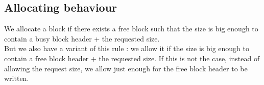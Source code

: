 \documentclass[twoside]{article}
\begin{document}
\subsection{Allocating behaviour}
We allocate a block if there exists a free block such that the size is big
enough to contain a busy block header + the requested size.\\

But we also have a variant of this rule : we allow it if the size is big enough
to contain a free block header + the requested size. If this is not the case,
instead of allowing the request size, we allow just enough for the free block
header to be written.
\end{document}
